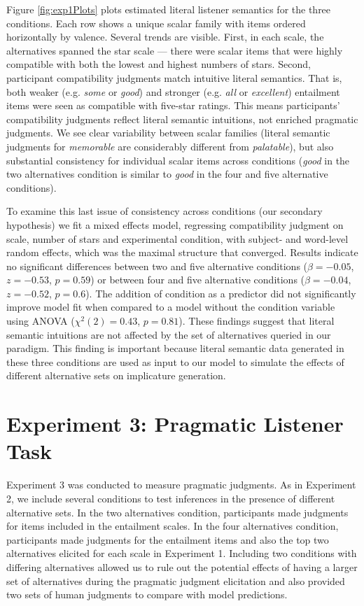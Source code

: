 \documentclass[10pt, letterpaper]{article}
\begin{document}
Figure \ref{fig:exp1Plots} plots estimated literal listener semantics
for the three conditions. Each row shows a unique scalar family with
items ordered horizontally by valence. Several trends are visible.
First, in each scale, the alternatives spanned the star scale --- there
were scalar items that were highly compatible with both the lowest and
highest numbers of stars. Second, participant compatibility judgments
match intuitive literal semantics. That is, both weaker (e.g.
\emph{some} or \emph{good}) and stronger (e.g. \emph{all} or
\emph{excellent}) entailment items were seen as compatible with
five-star ratings. This means participants' compatibility judgments
reflect literal semantic intuitions, not enriched pragmatic judgments.
We see clear variability between scalar families (literal semantic
judgments for \emph{memorable} are considerably different from
\emph{palatable}), but also substantial consistency for individual
scalar items across conditions (\emph{good} in the two alternatives
condition is similar to \emph{good} in the four and five alternative
conditions).

To examine this last issue of consistency across conditions (our
secondary hypothesis) we fit a mixed effects model, regressing
compatibility judgment on scale, number of stars and experimental
condition, with subject- and word-level random effects, which was the
maximal structure that converged. Results indicate no significant
differences between two and five alternative conditions
(\(\beta=-0.05\), \(z = -0.53\), \(p = 0.59\)) or between four and five
alternative conditions (\(\beta = -0.04\), \(z = -0.52\), \(p = 0.6\)).
The addition of condition as a predictor did not significantly improve
model fit when compared to a model without the condition variable using
ANOVA (\(\chi^2(2) = 0.43\), \(p = 0.81\)). These findings suggest that
literal semantic intuitions are not affected by the set of alternatives
queried in our paradigm. This finding is important because literal
semantic data generated in these three conditions are used as input to
our model to simulate the effects of different alternative sets on
implicature generation.

\section{Experiment 3: Pragmatic Listener
Task}\label{experiment-3-pragmatic-listener-task}

Experiment 3 was conducted to measure pragmatic judgments. As in
Experiment 2, we include several conditions to test inferences in the
presence of different alternative sets. In the two alternatives
condition, participants made judgments for items included in the
entailment scales. In the four alternatives condition, participants made
judgments for the entailment items and also the top two alternatives
elicited for each scale in Experiment 1. Including two conditions with
differing alternatives allowed us to rule out the potential effects of
having a larger set of alternatives during the pragmatic judgment
elicitation and also provided two sets of human judgments to compare
with model predictions.
\end{document}
